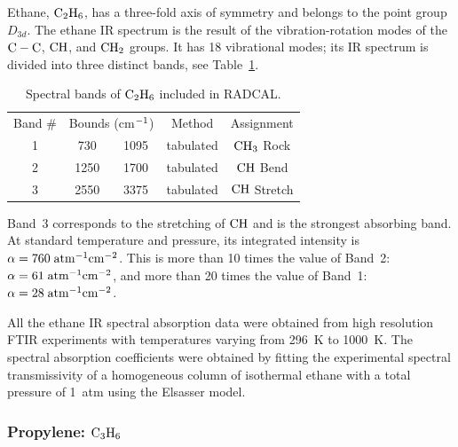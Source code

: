 Ethane, $\rm C_2H_6$, has a three-fold axis of symmetry and belongs to the point group $D_{3d}$. The ethane IR spectrum is the result of the vibration-rotation modes of the $\rm C-C$, $\rm CH$, and $\rm CH_2$ groups. It has 18 vibrational modes; its IR spectrum is divided into three distinct bands, see Table~\ref{Table::C2H6}.
\begin{table} [ht]
    \centering
    \caption{Spectral bands of $\rm C_2H_6$ included in RADCAL.}
    \vspace{0.1in}
    \label{Table::C2H6}
    \begin{tabular}{|c|c|c|c|c|}
      \hline
      Band \# & \multicolumn{2}{|l|}{Bounds (cm$\rm ^{-1}$) } & Method & Assignment \\
      \cline{1-5}
      1 & 730  & 1095 & tabulated &  $\rm CH_3$ Rock\\
      2 & 1250 & 1700 & tabulated &  $\rm CH$  Bend\\
      3 & 2550 & 3375 & tabulated &  $\rm CH$  Stretch\\
      \hline
    \end{tabular}
\end{table}
Band~3 corresponds to the stretching of $\rm CH$ and is the strongest absorbing band. At standard temperature and pressure, its integrated intensity is $\alpha = 760\;\rm {atm^{-1}cm^{-2}}$. This is more than 10 times the value of Band~2: $\alpha = 61\;\rm {atm^{-1}cm^{-2}}$, and more than 20 times the value of Band~1: $\alpha = 28\;\rm {atm^{-1}cm^{-2}}$.

All the ethane IR spectral absorption data were obtained from high resolution FTIR experiments with temperatures varying from 296~K to 1000~K. The spectral absorption coefficients were obtained by fitting the experimental spectral transmissivity of a homogeneous column of isothermal ethane with a total pressure of 1~atm using the Elsasser model.

\subsubsection{Propylene: $\rm C_3H_6$}

